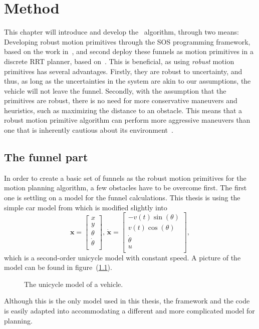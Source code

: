 \chapter{Method}

This chapter will introduce and develop the \rrtfunnel\ algorithm, through two
means: Developing robust motion primitives through the \ac{SOS} programming
framework, based on the work in~\cite{majumdarFunnelLibrariesRealtime2017}, and
second deploy these funnels as motion primitives in a discrete \ac{RRT} planner,
based on~\cite{lavalleLav98cPdf}. This is beneficial, as using \textit{robust}
motion primitives has several advantages. Firstly, they are robust to
uncertainty, and thus, as long as the uncertainties in the system are akin to
our assumptions, the vehicle will not leave the funnel. Secondly, with the
assumption that the primitives are robust, there is no need for more
conservative maneuvers and heuristics, such as maximizing the distance to an
obstacle. This means that a robust motion primitive algorithm can perform more
aggressive maneuvers than one that is inherently cautious about its
environment~\cite{majumdarFunnelLibrariesRealtime2017}.

\section{The funnel part}

In order to create a basic set of funnels as the robust motion primitives for
the \rrtfunnel{} motion planning algorithm, a few obstacles have to be overcome
first. The first one is settling on a model for the funnel calculations. This
thesis is using the simple car model from \cite[LaValle.p~613]{Lav06} which is
modified slightly into
\begin{equation}
  \label{eq:model-dynamics}
  \mathbf{x} =
  \begin{bmatrix}
    x \\ y \\ \theta \\ \dot{\theta} \\
  \end{bmatrix}, \, \dot{\mathbf{x}} =
  \begin{bmatrix}
    -v(t)\sin(\theta) \\
    v(t)\cos(\theta) \\
    \dot{\theta} \\
    u \\
  \end{bmatrix},
\end{equation}
which is a second-order unicycle model with constant speed. A picture of the
model can be found in figure~(\ref{fig:second-order-unicycle}).
\begin{figure}
  \centering {}
  \caption{The unicycle model of a vehicle.}
  \label{fig:second-order-unicycle}
\end{figure}
Although this is the only model used in this thesis, the framework and the code
is easily adapted into accommodating a different and more complicated model for
planning.


